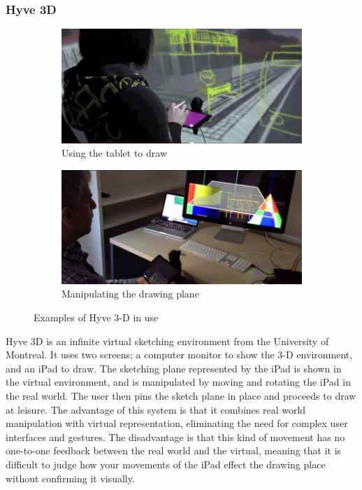 \documentclass[12pt]{article}
\begin{document}
\subsubsection{Hyve 3D}

\begin{figure}

\begin{subfigure}{\textwidth}
\includegraphics[width=0.9\linewidth]{Hyve3D1}
\caption{Using the tablet to draw}
\end{subfigure}
\begin{subfigure}{\textwidth}
\includegraphics[width=0.9\linewidth]{Hyve3D2}
\caption{Manipulating the drawing plane}
\end{subfigure}

\caption{Examples of Hyve 3-D in use}
\end{figure}

Hyve 3D is an infinite virtual sketching environment from the University of Montreal. It uses two screens; a computer monitor to show the 3-D environment, and an iPad to draw. The sketching plane represented by the iPad is shown in the virtual environment, and is manipulated by moving and rotating the iPad in the real world. The user then pins the sketch plane in place and proceeds to draw at leisure. The advantage of this system is that it combines real world manipulation with virtual representation, eliminating the need for complex user interfaces and gestures. The disadvantage is that this kind of movement has no one-to-one feedback between the real world and the virtual, meaning that it is difficult to judge how your movements of the iPad effect the drawing place without confirming it visually.
\end{document}

